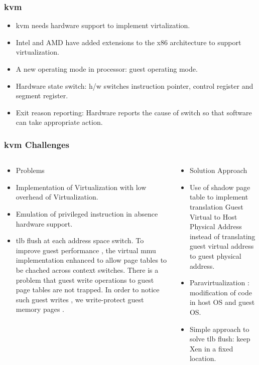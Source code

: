 \documentclass{beamer}
\begin{document}
\begin{frame} 
\frametitle{kvm}
\begin{itemize}
\item kvm needs hardware support to implement virtalization. 
\item Intel and AMD have added extensions to the x86 architecture to support virtualization.
\item A new operating mode in processor: guest operating mode.
\item Hardware state switch: h/w switches instruction pointer, control register and segment register. 
\item Exit reason reporting: Hardware reports the cause of switch so that software can take appropriate action\cite{kvm}.
\end{itemize}

\end{frame}
\begin{frame} 
\frametitle{kvm Challenges}
\begin{columns}
\begin{column}{0.5\textwidth}
\begin{itemize}
\item Problems
\item Implementation of Virtualization with low overhead of Virtualization.
\item Emulation of privileged instruction in absence hardware support.
\item tlb flush at each address space switch.
To improve guest performance , the virtual mmu
implementation enhanced to allow page tables
to be chached across context switches.
There is a problem that guest write operations to guest page tables are not trapped.
In order to notice such guest writes , we write-protect guest memory pages .
\end{itemize}
\end{column}
\begin{column}{0.5\textwidth}
\begin{itemize}
 \item Solution Approach
 \item Use of shadow page table to implement translation 
 Guest Virtual to Host Physical Address instead of translating guest virtual address to guest physical address\cite{xen}.
 \item Paravirtualization : modification of code in host OS and guest OS.\cite{xen}
 \item Simple approach to solve tlb flush: keep Xen in a fixed location.
\end{itemize}
\end{column}
\end{columns}
\end{frame}
\end{document}
